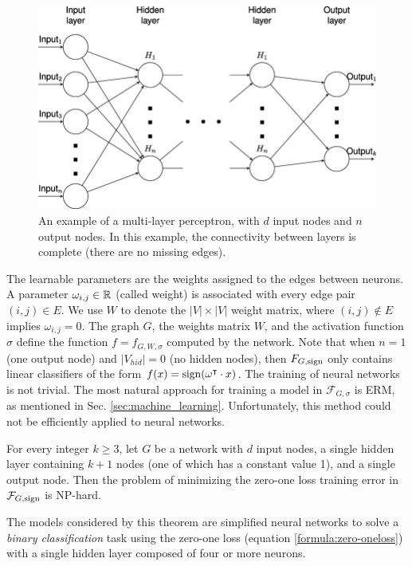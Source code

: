 \begin{figure}[h!]
	\centering
	\includegraphics[width=0.85\linewidth]{images/mlp.png}
	\caption{An example of a multi-layer perceptron, with $d$ input nodes and $n$ output nodes. In this example, the connectivity between layers is complete (there are no missing edges).}
\end{figure}

The learnable parameters are the weights assigned to the edges between neurons. 
A parameter $\omega_{i,j} \in \mathbb{R}$ (called weight) is associated with every edge pair $(i, j) \in E$.  We use $W$ to denote the $|V | \times |V |$ weight matrix, where $(i, j) \notin E$ implies $\omega_{i,j} = 0$. The graph $G$, the weights matrix
$W$, and the activation function $\sigma$ define the function $f = f_{G,W,\sigma}$ computed by the network.  Note that when $n = 1$ (one output node) and $|V_{hid}| = 0$ (no hidden nodes), then $F_{G,\operatorname{sign}}$ only contains linear classifiers of the form $f(x) = \operatorname{sign}(\omega^\intercal \cdot x)$. The training of neural networks is not trivial. The most natural approach for training a model in $\mathcal{F}_{G,\sigma}$ is ERM, as mentioned in Sec. \ref{sec:machine_learning}.
Unfortunately, this method could not be efficiently applied to neural networks. 

\begin{theorem}
	For every integer $k \geq 3$, let $G$ be a network with $d$ input nodes, a single hidden layer containing $k + 1$ nodes (one of which has a constant value 1), and a single output node. Then the problem of minimizing the zero-one loss training error in $\mathcal{F}_{G,\operatorname{sign}}$ is NP-hard. 
\end{theorem}

The models considered by this theorem are simplified neural networks to solve a \textit{binary classification} task using the zero-one loss (equation \ref{formula:zero-oneloss}) with a single hidden layer composed of four or more neurons. 


